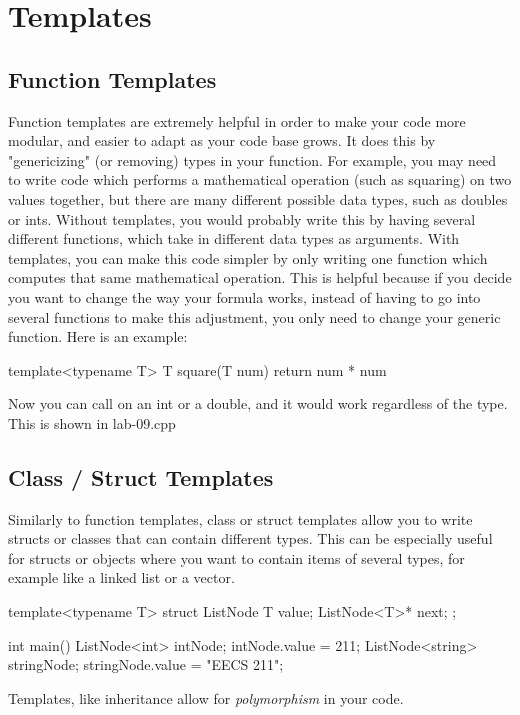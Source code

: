 \documentclass{tufte-handout}
\begin{document}
\section{Templates}

\subsection{Function Templates}
Function templates are extremely helpful in order to make your code more modular, and easier to adapt as your code base grows.
It does this by "genericizing" (or removing) types in your function.
For example,  you may  need to write code which performs a mathematical operation (such as squaring) on two values together, but there are many different possible data types, such as doubles or ints.
Without templates, you would probably write this by having several different functions, which take in different data types as arguments.
With templates, you can make this code simpler by only writing one function which computes that same mathematical operation.  
This is helpful because if you decide you want to change the way your formula works, instead of having to go into several functions to make this adjustment, you only need to change your generic function.
Here is an example:

\begin{Code}
template<typename T>
T square(T num) {
    return num * num
}
\end{Code}

Now you can call  on an int or a double, and it would work regardless of the type.
This is shown in lab-09.cpp

\subsection{Class / Struct Templates}
Similarly to function templates, class or struct templates allow you to write structs or classes that  can contain different types.  
This can be especially useful for structs or objects where you want to contain items of several types, for example like a linked list or a vector.

\begin{Code}
template<typename T>
struct ListNode {
    T value;
    ListNode<T>* next;
};

int main() {
    ListNode<int> intNode;
    intNode.value = 211;
    ListNode<string> stringNode;
    stringNode.value = "EECS 211";
}
\end{Code}
Templates, like inheritance allow for \textit{polymorphism} in your code.
\end{document}
